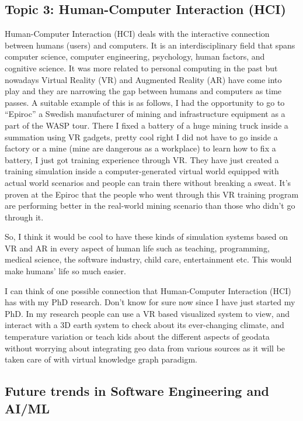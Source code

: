 \documentclass[10.9pt]{article}
\begin{document}
\subsection*{Topic 3: Human-Computer Interaction (HCI)}
Human-Computer Interaction (HCI) deals with the interactive connection between humans (users) and computers. It is an interdisciplinary field that spans computer science, computer engineering, psychology, human factors, and cognitive science. It was more related to personal computing in the past but nowadays Virtual Reality (VR) and Augmented Reality (AR) have come into play and they are narrowing the gap between humans and computers as time passes.  A suitable example of this is as follows, I had the opportunity to go to “Epiroc” a Swedish manufacturer of mining and infrastructure equipment as a part of the WASP tour. There I fixed a battery of a huge mining truck inside a summation using VR gadgets, pretty cool right I did not have to go inside a factory or a mine (mine are dangerous as a workplace) to learn how to fix a battery, I just got training experience through VR. They have just created a training simulation inside a computer-generated virtual world equipped with actual world scenarios and people can train there without breaking a sweat. It’s proven at the Epiroc that the people who went through this VR training program are performing better in the real-world mining scenario than those who didn’t go through it.

So, I think it would be cool to have these kinds of simulation systems based on VR and AR in every aspect of human life such as teaching, programming, medical science, the software industry, child care, entertainment etc. This would make humans’ life so much easier. 

I can think of one possible connection that Human-Computer Interaction (HCI) has with my PhD research. Don’t know for sure now since I have just started my PhD.  In my research people can use a VR based visualized system to view, and interact with a 3D earth system to check about its ever-changing climate, and temperature variation or teach kids about the different aspects of geodata without worrying about integrating geo data from various sources as it will be taken care of with virtual knowledge graph paradigm.   

\subsection*{Future trends in Software Engineering and AI/ML}
\end{document}
